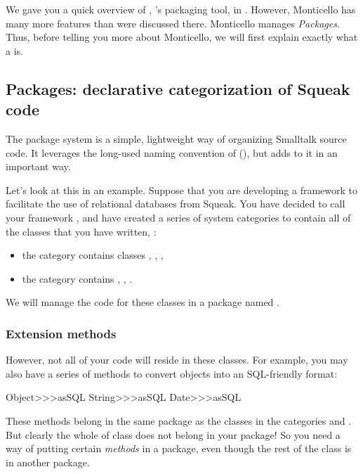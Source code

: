 \documentclass[a4paper,10pt,twoside]{book}
\begin{document}
We gave you a quick overview of , \Squeak's packaging tool, in .
However, Monticello has many more features than were discussed there.
Monticello manages \emph{Packages}.
Thus, before telling you more about Monticello, we will first explain exactly what a  is.

\subsection{Packages: declarative categorization of Squeak code}

The package system is a simple, lightweight way of organizing Smalltalk source code.
It leverages the long-used naming convention of \sq (), but adds to it in an important way.

Let's look at this in an example.
Suppose that you are developing a framework to facilitate the use of relational databases from Squeak.
You have decided to call your framework , and have created a series of system categories to contain all of the classes that you have written, \eg*:

\begin{itemize}
\item the category  contains classes , , ,
\item the category  contains , , .
\end{itemize}

We will manage the code for these classes in a package named .

\subsubsection{Extension methods}

However, not all of your code will reside in these classes.
For example, you may also have a series of methods to convert objects into an SQL-friendly format:

\begin{code}{}
Object>>>asSQL
String>>>asSQL
Date>>>asSQL
\end{code}

\noindent
These methods belong in the same package as the classes in the categories  and .
But clearly the whole of class  does not belong in your package!
So you need a way of putting certain \emph{methods} in a package, even though the rest of the class is in another package.
\end{document}
